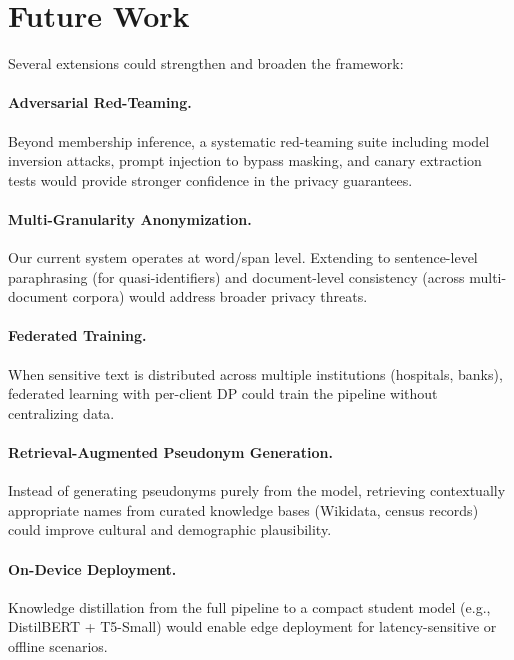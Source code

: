 \documentclass[11pt, a4paper]{article}
\begin{document}
\section{Future Work}
\label{sec:future}

Several extensions could strengthen and broaden the framework:

\paragraph{Adversarial Red-Teaming.}
Beyond membership inference, a systematic red-teaming suite including
model inversion attacks, prompt injection to bypass masking, and canary
extraction tests would provide stronger confidence in the privacy
guarantees.

\paragraph{Multi-Granularity Anonymization.}
Our current system operates at word/span level.  Extending to
sentence-level paraphrasing (for quasi-identifiers) and
document-level consistency (across multi-document corpora) would
address broader privacy threats.

\paragraph{Federated Training.}
When sensitive text is distributed across multiple institutions
(hospitals, banks), federated learning with per-client DP could train
the pipeline without centralizing data.

\paragraph{Retrieval-Augmented Pseudonym Generation.}
Instead of generating pseudonyms purely from the model, retrieving
contextually appropriate names from curated knowledge bases (Wikidata,
census records) could improve cultural and demographic plausibility.

\paragraph{On-Device Deployment.}
Knowledge distillation from the full pipeline to a compact student
model (e.g., DistilBERT + T5-Small) would enable edge deployment
for latency-sensitive or offline scenarios.
\end{document}
